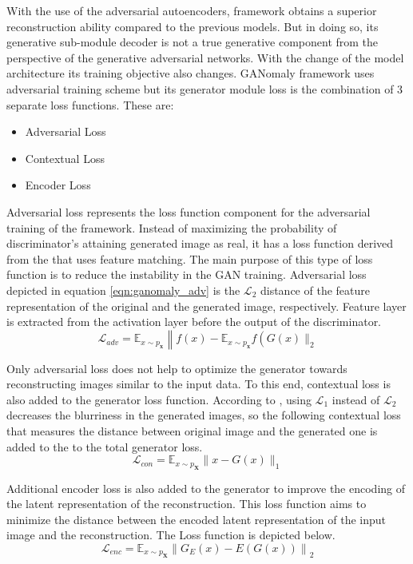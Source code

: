  With the use of the adversarial autoencoders, framework obtains a superior reconstruction ability
compared to the previous models. But in doing so, its generative sub-module decoder is not a true
generative component from the perspective of the generative adversarial networks. With the change of
the model architecture its training objective also changes. GANomaly framework uses adversarial
training scheme but its generator module loss is the combination of 3 separate loss functions. These
are:
\begin{itemize}
   \item Adversarial Loss
   \item Contextual Loss
   \item Encoder Loss 
\end{itemize} 

Adversarial loss represents the loss function component for the adversarial training of the
framework. Instead of maximizing the probability of discriminator's attaining generated image as
real, it has a loss function derived from the \cite{fm} that uses feature matching. The main purpose
of this type of loss function is to reduce the instability in the GAN training. Adversarial loss
depicted in equation \ref{eqn:ganomaly_adv} is the $\mathcal{L}_{2}$ distance of the feature
representation of the original and the generated image, respectively. \cite{Akay2018GANomalySA}
Feature layer is extracted from the activation layer before the output of the discriminator.  
\begin{equation}
    \label{eqn:ganomaly_adv}
    \mathcal{L}_{a d v}=\mathbb{E}_{x \sim p_{\mathbf{x}}}\left\|f(x)-\mathbb{E}_{x \sim p_{\mathbf{x}}} f\left(G(x) \|_{2}\right.\right. 
\end{equation}

Only adversarial loss does not help to optimize the generator towards reconstructing images similar
to the input data. To this end, contextual loss is also added to the generator loss function.
According to \cite{Isola2017ImagetoImageTW}, using $\mathcal{L}_1$ instead of $\mathcal{L}_2$
decreases the blurriness in the generated images, so the following contextual loss that measures the
distance between original image and the generated one is added to the to the total generator loss.
\begin{equation}
    \mathcal{L}_{c o n}=\mathbb{E}_{x \sim p_{\mathbf{X}}}\|x-G(x)\|_{1} 
\end{equation}

Additional encoder loss is also added to the generator to improve the encoding of the latent
representation of the reconstruction. This loss function aims to minimize the distance between the
encoded latent representation of the input image and the reconstruction. The Loss function is
depicted below.
\begin{equation}
    \mathcal{L}_{e n c}=\mathbb{E}_{x \sim p_{\mathbf{X}}}\left\|G_{E}(x)-E(G(x))\right\|_{2} 
\end{equation}


